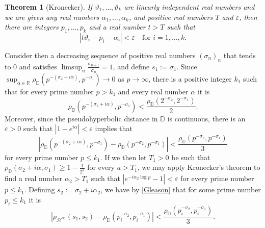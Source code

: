 \documentclass[preprint,12pt,number]{elsarticle}
\newtheorem{theorem}{Theorem}[section]
\newcommand{\R}{\mathbb{R}}
\newcommand{\D}{\mathbb{D}}
\begin{document}
\begin{theorem}[Kronecker]
    If $\vartheta_1,\dots,\vartheta_k$ are linearly independent real numbers and we are given any real numbers $\alpha_1,\dots,\alpha_k$, and positive real numbers $T$ and $\varepsilon$, then there are integers $p_1,\dots, p_k$ and a real number $t>T$ such that 
    \[
    |t\vartheta_i-p_i-\alpha_i|<\varepsilon \quad \text{for } i=1,\dots,k.
    \]
\end{theorem} 

Consider then a decreasing sequence of positive real numbers $(\sigma_n)_n$ that tends to $0$ and satisfies $\limsup_n\frac{\sigma_{n+1}}{\sigma_n}=1$, and define $s_1:=\sigma_1$. Since $\sup_{\alpha\in \R}\rho_\D(p^{-(\sigma_2+i\alpha)},p^{-\sigma_1})\to 0$ as $p\to\infty$, there is a positive integer $k_1$ such that for every prime number $p>k_1$ and every real number $\alpha$ it is 
\[
\rho_\D(p^{-(\sigma_2+i\alpha)},p^{-\sigma_1})<\frac{\rho_\D(2^{-\sigma_2},2^{-\sigma_1})}{2}.
\] 
Moreover, since the pseudohyperbolic distance in $\D$ is continuous, there is an $\varepsilon>0$ such that $|1-e^{i\alpha}|<\varepsilon$ implies that 
\[
|\rho_\D(p^{-(\sigma_2+i\alpha)},p^{-\sigma_1})-\rho_\D(p^{-\sigma_2},p^{-\sigma_1})|<\frac{\rho_\D(p^{-\sigma_2},p^{-\sigma_1})}{3}
\] 
for every prime number $p\leq k_1$. If we then let $T_1>0$ be such that $\rho_\D(\sigma_2+i\alpha,\sigma_1)\geq1-\frac{1}{2^3}$ for every $a> T_1$, we may apply Kronecker's theorem to find a real number $\alpha_2>T_1$ such that $|e^{-i\alpha_2 \log p}-1|<\varepsilon$ for every prime number $p\leq k_1$. Defining $s_2:=\sigma_2+i\alpha_2$, we have by \eqref{Gleason} that for some prime number $p_i\leq k_1$ it is 
\[
|\rho_{\mathscr{H}^{\infty}}(s_1,s_2)-\rho_\D(p_i^{-\sigma_2},p_i^{-\sigma_1})|<\frac{\rho_\D(p_i^{-\sigma_2},p_i^{-\sigma_1})}{3}.
\]  
\end{document}
